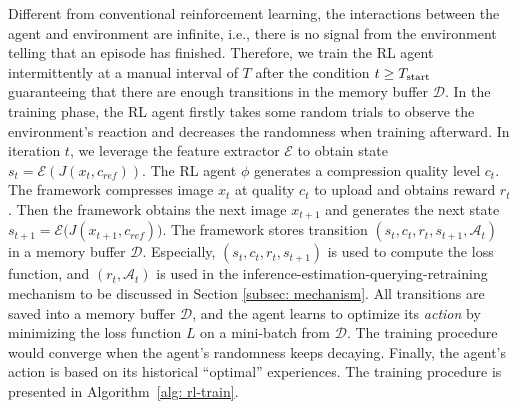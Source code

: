 Different from conventional reinforcement learning, the interactions between the agent and environment are infinite, i.e., there is no signal from the environment telling that an episode has finished. Therefore, we train the RL agent intermittently at a manual interval of $ T $ after the condition $ t \geq T_{\rm start} $ guaranteeing that there are enough transitions in the memory buffer $ \mathcal{D} $. In the training phase, the RL agent firstly takes some random trials to observe the environment's reaction and decreases the randomness when training afterward. {\color{revise2} In iteration $t$, we  leverage the feature extractor $\mathcal{E}$ to obtain state $s_t = \mathcal{E}(J(x_t,c_{ref}))$. The RL agent $\phi$ generates a compression quality level $c_t$. The framework compresses image $x_t$ at quality $c_t$ to upload and obtains reward $r_t$. Then the framework obtains the next image $x_{t+1}$ and generates the next state $ s_{t+1} = \mathcal{E}\big(J(x_{t+1},c_{ref})\big) $. The framework stores transition $(s_t, c_t, r_t, s_{t+1},\mathcal{A}_t )$ in a memory buffer $\mathcal{D}$. Especially, $(s_t, c_t, r_t, s_{t+1} )$ is used to compute the loss function, and $(r_t,\mathcal{A}_t )$ is used in the inference-estimation-querying-retraining mechanism to be discussed in Section \ref{subsec: mechanism}.} All transitions are saved into a memory buffer $ \mathcal{D} $, and the agent learns to optimize its \emph{action} by minimizing the loss function $ L $ on a mini-batch from $ \mathcal{D} $. The training procedure would converge when the agent's randomness keeps decaying. Finally, the agent's action is based on its historical ``optimal'' experiences. The training procedure is presented in Algorithm~\ref{alg: rl-train}.

